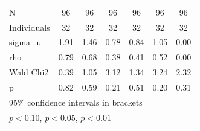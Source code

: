 {\begin{tabular}{l*{6}{c}}
\midrule
N           &                    96         &                    96         &                    96         &                    96         &                    96         &                    96         \\
Individuals &                    32         &                    32         &                    32         &                    32         &                    32         &                    32         \\
sigma\_u     &                  1.91         &                  1.46         &                  0.78         &                  0.84         &                  1.05         &                  0.00         \\
rho         &                  0.79         &                  0.68         &                  0.38         &                  0.41         &                  0.52         &                  0.00         \\
Wald Chi2   &                  0.39         &                  1.05         &                  3.12         &                  1.34         &                  3.24         &                  2.32         \\
p           &                  0.82         &                  0.59         &                  0.21         &                  0.51         &                  0.20         &                  0.31         \\
\bottomrule
\multicolumn{7}{l}{\footnotesize 95\% confidence intervals in brackets}\\
\multicolumn{7}{l}{\footnotesize \sym{*} \(p<0.10\), \sym{**} \(p<0.05\), \sym{***} \(p<0.01\)}\\
\end{tabular}
}
